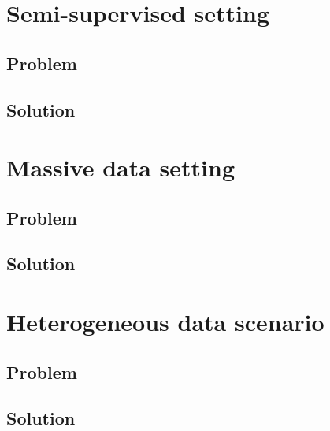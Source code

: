 \documentclass[a4paper]{article}
\begin{document}
\section{Semi-supervised setting}

\subsection{Problem}

\subsection{Solution}


\section{Massive data setting}

\subsection{Problem}

\subsection{Solution}


\section{Heterogeneous data scenario}

\subsection{Problem}

\subsection{Solution}
\end{document}
